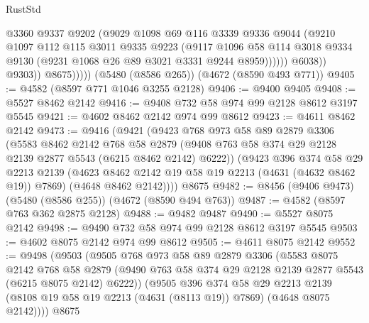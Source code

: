 \begin{lexlean}{RustStd}
\begin{coremodule}
{\begin{coremodule}
{{{{{{{{{{{{{{{{                          @3360
                          @9337
                          @9202
                          (@9029
                            @1098
                            @69
                            @116
                            @3339
                            @9336
                            @9044
                            (@9210
                              @1097
                              @112
                              @115
                              @3011
                              @9335
                              @9223
                              (@9117
                                @1096
                                @58
                                @114
                                @3018
                                @9334
                                @9130
                                (@9231 @1068 @26 @89 @3021 @3331 @9244 @8959))))))
                      @6038))
                  @9303))
              @8675)))))
    (@5480 (@8586 @265))
    (@4672 (@8590 @493 @771))
@9405 := @4582 (@8597 @771 @1046 @3255 @2128)
@9406 := @9400 @9405
@9408 := @5527 @8462 @2142
@9416 := @9408 @732 @58 @974 @99 @2128 @8612 @3197 @5545
@9421 := @4602 @8462 @2142 @974 @99 @8612
@9423 := @4611 @8462 @2142
@9473 := @9416
    (@9421
      (@9423
        @768
        @973
        @58
        @89
        @2879
        @3306
        (@5583
          @8462
          @2142
          @768
          @58
          @2879
          (@9408 @763 @58 @374 @29 @2128 @2139 @2877 @5543 (@6215 @8462 @2142) @6222))
        (@9423
          @396
          @374
          @58
          @29
          @2213
          @2139
          (@4623 @8462 @2142 @19 @58 @19 @2213 (@4631 (@4632 @8462 @19)) @7869)
          (@4648 @8462 @2142))))
    @8675
@9482 := @8456 (@9406 @9473) (@5480 (@8586 @255)) (@4672 (@8590 @494 @763))
@9487 := @4582 (@8597 @763 @362 @2875 @2128)
@9488 := @9482 @9487
@9490 := @5527 @8075 @2142
@9498 := @9490 @732 @58 @974 @99 @2128 @8612 @3197 @5545
@9503 := @4602 @8075 @2142 @974 @99 @8612
@9505 := @4611 @8075 @2142
@9552 := @9498
    (@9503
      (@9505
        @768
        @973
        @58
        @89
        @2879
        @3306
        (@5583
          @8075
          @2142
          @768
          @58
          @2879
          (@9490 @763 @58 @374 @29 @2128 @2139 @2877 @5543 (@6215 @8075 @2142) @6222))
        (@9505
          @396
          @374
          @58
          @29
          @2213
          @2139
          (@8108 @19 @58 @19 @2213 (@4631 (@8113 @19)) @7869)
          (@4648 @8075 @2142))))
    @8675
}}}}}}}}}}}}}}}}
\end{coremodule}}
\end{coremodule}
\end{lexlean}
